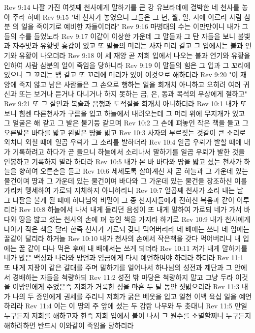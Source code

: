 Rev 9:14  나팔 가진 여섯째 천사에게 말하기를 큰 강 유브라데에 결박한 네 천사를 놓아 주라 하매
Rev 9:15  "네 천사가 놓였으니 그들은 그 년, 월, 일, 시에 이르러 사람 삼분 의 일을 죽이기로 예비한 자들이더라"
Rev 9:16  마병대의 수는 이만만이니 내가 그들의 수를 들었노라
Rev 9:17  이같이 이상한 가운데 그 말들과 그 탄 자들을 보니 불빛과 자주빛과 유황빛 흉갑이 있고 또 말들의 머리는 사자 머리 같고 그 입에서는 불과 연기와 유황이 나오더라
Rev 9:18  이 세 재앙 곧 저희 입에서 나오는 불과 연기와 유황을 인하여 사람 삼분의 일이 죽임을 당하니라
Rev 9:19  이 말들의 힘은 그 입과 그 꼬리에 있으니 그 꼬리는 뱀 같고 또 꼬리에 머리가 있어 이것으로 해하더라
Rev 9:20  "이 재앙에 죽지 않고 남은 사람들은 그 손으로 행하는 일을 회개치 아니하고 오히려 여러 귀신과 또는 보거나 듣거나 다니거나 하지 못하는 금, 은, 동과 목석의 우상에게 절하고"
Rev 9:21  또 그 살인과 복술과 음행과 도적질을 회개치 아니하더라
Rev 10:1  내가 또 보니 힘센 다른천사가 구름을 입고 하늘에서 내려오는데 그 머리 위에 무지개가 있고 그 얼굴은 해 같고 그 발은 불기둥 같으며
Rev 10:2  그 손에 펴놓인 작은 책을 들고 그 오른발은 바다를 밟고 왼발은 땅을 밟고
Rev 10:3  사자의 부르짖는 것같이 큰 소리로 외치니 외칠 때에 일곱 우뢰가 그 소리를 발하더라
Rev 10:4  일곱 우뢰가 발할 때에 내가 기록하려고 하다가 곧 들으니 하늘에서 소리나서 말하기를 일곱 우뢰가 발한 것을 인봉하고 기록하지 말라 하더라
Rev 10:5  내가 본 바 바다와 땅을 밟고 섰는 천사가 하늘을 향하여 오른손을 들고
Rev 10:6  세세토록 살아계신 자 곧 하늘과 그 가운데 있는 물건이며 땅과 그 가운데 있는 물건이며 바다와 그 가운데 있는 물건을 창조하신 이를 가리켜 맹세하여 가로되 지체하지 아니하리니
Rev 10:7  일곱째 천사가 소리 내는 날 그 나팔을 불게 될 때에 하나님의 비밀이 그 종 선지자들에게 전하신 복음과 같이 이루리라
Rev 10:8  하늘에서 나서 내게 들리던 음성이 또 내게 말하여 가로되 네가 가서 바다와 땅을 밟고 섰는 천사의 손에 펴 놓인 책을 가지라 하기로
Rev 10:9  내가 천사에게 나아가 작은 책을 달라 한즉 천사가 가로되 갖다 먹어버리라 네 배에는 쓰나 네 입에는 꿀같이 달리라 하거늘
Rev 10:10  내가 천사의 손에서 작은책을 갖다 먹어버리니 내 입에는 꿀 같이 다나 먹은 후에 내 배에서는 쓰게 되더라
Rev 10:11  저가 내게 말하기를 네가 많은 백성과 나라와 방언과 임금에게 다시 예언하여야 하리라 하더라
Rev 11:1  또 내게 지팡이 같은 갈대를 주며 말하기를 일어나서 하나님의 성전과 제단과 그 안에서 경배하는 자들을 척량하되
Rev 11:2  성전 밖 마당은 척량하지 말고 그냥 두라 이것을 이방인에게 주었은즉 저희가 거룩한 성을 마흔 두 달 동안 짓밟으리라
Rev 11:3  내가 나의 두 증인에게 권세를 주리니 저희가 굵은 베옷을 입고 일천 이백 육십 일을 예언하리라
Rev 11:4  이는 이 땅의 주 앞에 섰는 두 감람 나무와 두 촛대니
Rev 11:5  만일 누구든지 저희를 해하고자 한즉 저희 입에서 불이 나서 그 원수를 소멸할찌니 누구든지 해하려하면 반드시 이와같이 죽임을 당하리라
